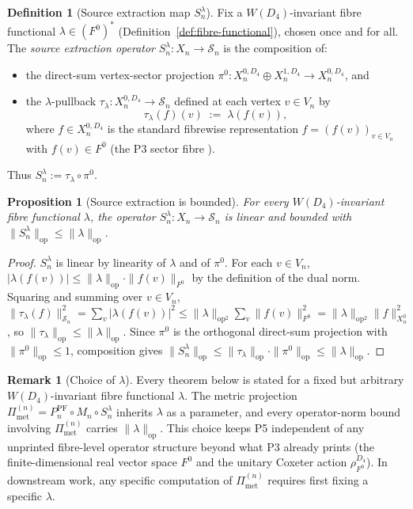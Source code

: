 \documentclass[11pt, a4paper]{amsart}
\newtheorem{proposition}[theorem]{Proposition}
\theoremstyle{definition}
\newtheorem{definition}[theorem]{Definition}
\newtheorem{remark}[theorem]{Remark}
\newcommand{\op}{\operatorname{op}}
\newcommand{\Met}{\mathrm{met}}
\newcommand{\PF}{\mathrm{PF}}
\newcommand{\Pimet}{\Pi_{\Met}}
\begin{document}
\begin{definition}[Source extraction map $S_n^\lambda$]
\label{def:source-extraction}
Fix a $W(D_4)$-invariant fibre functional $\lambda \in (F^0)^\ast$
(Definition~\ref{def:fibre-functional}), chosen once and for all.
The \emph{source extraction operator}
$S_n^\lambda \colon X_n \to \mathcal S_n$ is the composition of:
\begin{itemize}
\item the direct-sum vertex-sector projection
  $\pi^0 \colon X_n^{0, D_4} \oplus X_n^{1, D_4} \to X_n^{0, D_4}$,
  and
\item the $\lambda$-pullback $\tau_\lambda \colon
  X_n^{0, D_4} \to \mathcal S_n$ defined at each vertex
  $v \in V_n$ by
  \[
    \tau_\lambda(f)(v) \;:=\; \lambda(f(v)),
  \]
  where $f \in X_n^{0, D_4}$ is the standard fibrewise
  representation $f = (f(v))_{v \in V_n}$ with
  $f(v) \in F^0$ (the P3 sector fibre
  \cite[Notation~3.3]{RefinementSpaces}).
\end{itemize}
Thus $S_n^\lambda := \tau_\lambda \circ \pi^0$.
\end{definition}

\begin{proposition}[Source extraction is bounded]
\label{prop:source-bounded}
For every $W(D_4)$-invariant fibre functional $\lambda$, the
operator $S_n^\lambda \colon X_n \to \mathcal S_n$ is linear and
bounded with
$\|S_n^\lambda\|_\op \leq \|\lambda\|_\op$.
\end{proposition}

\begin{proof}
$S_n^\lambda$ is linear by linearity of $\lambda$ and of $\pi^0$.
For each $v \in V_n$, $|\lambda(f(v))| \leq \|\lambda\|_\op
\cdot \|f(v)\|_{F^0}$ by the definition of the dual norm. Squaring
and summing over $v \in V_n$,
$\|\tau_\lambda(f)\|_{\mathcal S_n}^2 = \sum_v |\lambda(f(v))|^2
\leq \|\lambda\|_\op^2 \sum_v \|f(v)\|_{F^0}^2 =
\|\lambda\|_\op^2 \|f\|_{X_n^0}^2$,
so $\|\tau_\lambda\|_\op \leq \|\lambda\|_\op$. Since $\pi^0$ is
the orthogonal direct-sum projection with $\|\pi^0\|_\op \leq 1$,
composition gives
$\|S_n^\lambda\|_\op \leq \|\tau_\lambda\|_\op \cdot \|\pi^0\|_\op
\leq \|\lambda\|_\op$.
\end{proof}

\begin{remark}[Choice of $\lambda$]
\label{rmk:source-choice}
Every theorem below is stated for a fixed but arbitrary
$W(D_4)$-invariant fibre functional $\lambda$. The metric
projection $\Pimet^{(n)} = P_n^\PF \circ M_n \circ S_n^\lambda$
inherits $\lambda$ as a parameter, and every operator-norm bound
involving $\Pimet^{(n)}$ carries $\|\lambda\|_\op$. This choice
keeps P5 independent of any unprinted fibre-level operator
structure beyond what P3 already prints (the finite-dimensional
real vector space $F^0$ and the unitary Coxeter action
$\rho_{F^0}^{D_4}$). In downstream work, any specific
computation of $\Pimet^{(n)}$ requires first fixing a specific
$\lambda$.
\end{remark}
\end{document}
